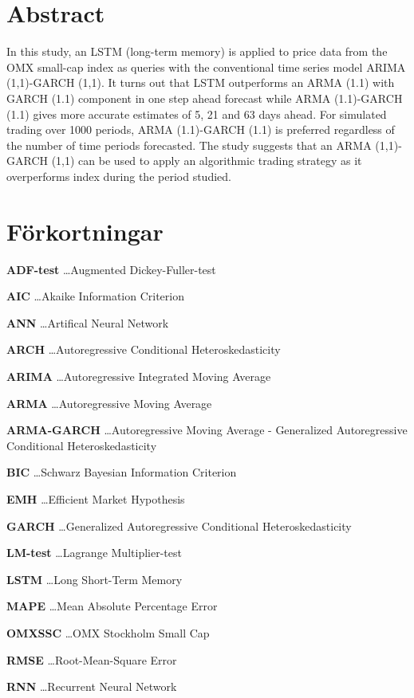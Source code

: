 \documentclass[11pt]{article}
\begin{document}
\section*{Abstract}
In this study, an LSTM (long-term memory) is applied to price data from the OMX small-cap index as queries with the conventional time series model ARIMA (1,1)-GARCH (1,1). It turns out that LSTM outperforms an ARMA (1.1) with GARCH (1.1) component in one step ahead forecast while ARMA (1.1)-GARCH (1.1) gives more accurate estimates of 5, 21 and 63 days ahead. For simulated trading over 1000 periods, ARMA (1.1)-GARCH (1.1) is preferred regardless of the number of time periods forecasted. The study suggests that an ARMA (1,1)-GARCH (1,1) can be used to apply an algorithmic trading strategy as it overperforms index during the period studied.


\newpage
\tableofcontents
\newpage

\newpage 

\section*{Förkortningar}
\textbf{ADF-test} \dots Augmented Dickey-Fuller-test \par
\textbf{AIC} \dots Akaike Information Criterion \par
\textbf{ANN} \dots Artifical Neural Network \par
\textbf{ARCH} \dots Autoregressive Conditional Heteroskedasticity \par
\textbf{ARIMA} \dots Autoregressive Integrated Moving Average \par
\textbf{ARMA} \dots Autoregressive Moving Average \par 
\textbf{ARMA-GARCH} \dots Autoregressive Moving Average - Generalized Autoregressive Conditional Heteroskedasticity \par 
\textbf{BIC} \dots Schwarz Bayesian Information Criterion \par
\textbf{EMH} \dots Efficient Market Hypothesis \par
\textbf{GARCH} \dots Generalized Autoregressive Conditional Heteroskedasticity \par
\textbf{LM-test} \dots Lagrange Multiplier-test \par
\textbf{LSTM} \dots Long Short-Term Memory \par
\textbf{MAPE} \dots Mean Absolute Percentage Error \par
\textbf{OMXSSC} \dots OMX Stockholm Small Cap \par
\textbf{RMSE} \dots Root-Mean-Square Error \par
\textbf{RNN} \dots Recurrent Neural Network \par
\end{document}
